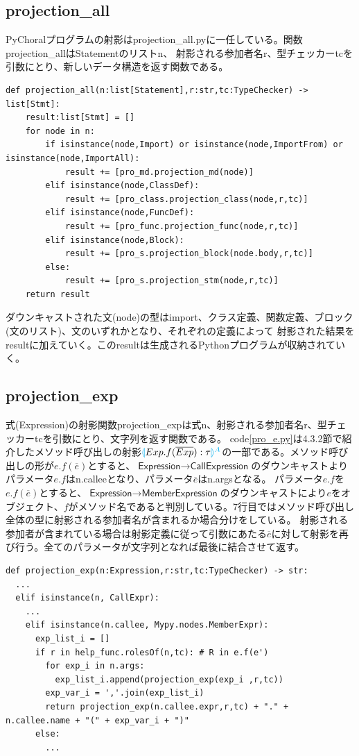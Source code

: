 \documentclass{thesis}
\newcommand{\projection}[2]{{\color{cyan}\llparenthesis}#1{\color{cyan}\rrparenthesis^#2}}
\begin{document}
\subsection{projection\_all}
PyChoralプログラムの射影はprojection\_all.pyに一任している。関数projection\_allはStatementのリスト\textsf{n}、
射影される参加者名\textsf{r}、型チェッカー\textsf{tc}を引数にとり、新しいデータ構造を返す関数である。
\begin{lstlisting}[caption=projection\_all.py,label=pro.py]
def projection_all(n:list[Statement],r:str,tc:TypeChecker) -> list[Stmt]:
    result:list[Stmt] = []
    for node in n:
        if isinstance(node,Import) or isinstance(node,ImportFrom) or isinstance(node,ImportAll):
            result += [pro_md.projection_md(node)]
        elif isinstance(node,ClassDef):
            result += [pro_class.projection_class(node,r,tc)]
        elif isinstance(node,FuncDef):
            result += [pro_func.projection_func(node,r,tc)]
        elif isinstance(node,Block):
            result += [pro_s.projection_block(node.body,r,tc)]
        else:
            result += [pro_s.projection_stm(node,r,tc)]
    return result
\end{lstlisting}
ダウンキャストされた文(node)の型はimport、クラス定義、関数定義、ブロック(文のリスト)、文のいずれかとなり、それぞれの定義によって
射影された結果をresultに加えていく。このresultは生成されるPythonプログラムが収納されていく。
\subsection{projection\_exp}
式(Expression)の射影関数projection\_expは式\textsf{n}、射影される参加者名\textsf{r}、型チェッカー\textsf{tc}を引数にとり、文字列を返す関数である。
code\ref{pro_e.py}は4.3.2節で紹介したメソッド呼び出しの射影$\projection{Exp.f(\overline{Exp}):\tau}{A}$の一部である。メソッド呼び出しの形が$e.f(\overline{e})$とすると、$\textsf{Expression} \rightarrow \textsf{CallExpression}$のダウンキャストよりパラメータ$e.f$はn.calleeとなり、パラメータ$\overline{e}$はn.argsとなる。
パラメータ$e.f$を$e.f(\overline{e})$とすると、$\textsf{Expression} \rightarrow \textsf{MemberExpression}$のダウンキャストにより$e$をオブジェクト、$f$がメソッド名であると判別している。7行目ではメソッド呼び出し全体の型に射影される参加者名が含まれるか場合分けをしている。
射影される参加者が含まれている場合は射影定義に従って引数にあたる$\overline{e}$に対して射影を再び行う。全てのパラメータが文字列となれば最後に結合させて返す。

\begin{lstlisting}[caption=pro\_e.py,label=pro_e.py]
def projection_exp(n:Expression,r:str,tc:TypeChecker) -> str:
  ... 
  elif isinstance(n, CallExpr):
    ... 
    elif isinstance(n.callee, Mypy.nodes.MemberExpr):
      exp_list_i = []
      if r in help_func.rolesOf(n,tc): # R in e.f(e')
        for exp_i in n.args:
          exp_list_i.append(projection_exp(exp_i ,r,tc))
        exp_var_i = ','.join(exp_list_i)
        return projection_exp(n.callee.expr,r,tc) + "." + n.callee.name + "(" + exp_var_i + ")"
      else:
        ... 
\end{lstlisting}
\end{document}
